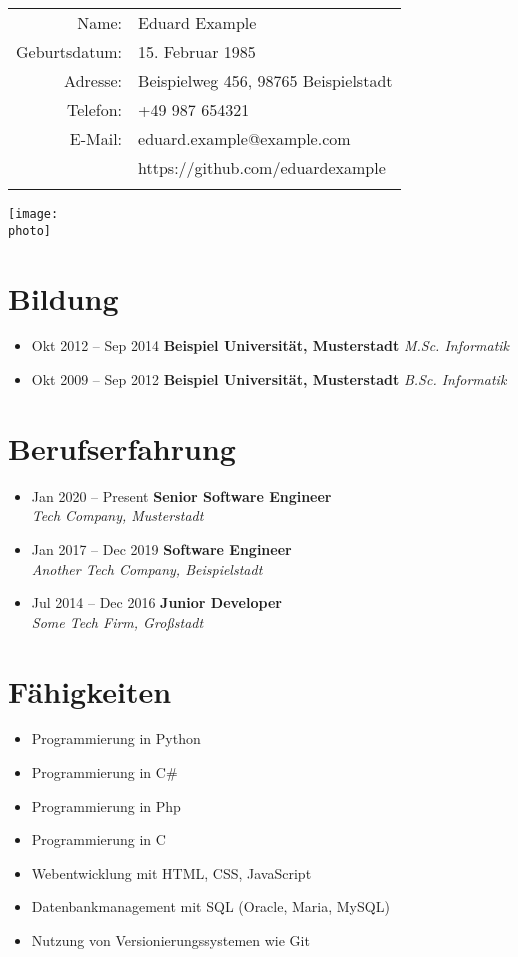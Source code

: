 \documentclass{scrartcl}
\makeatletter
\newcommand{\name}{Max Mustermann}
\newcommand{\birthdate}{1. Januar 1990}
\newcommand{\address}{Musterstraße 123, 12345 Musterstadt}
\newcommand{\phone}{+49 123 456789}
\newcommand{\email}{max.mustermann@example.com}
\newcommand{\photo}{photo.jpg} %
\newcommand{\personaldata}{
    \begin{minipage}{0.75\textwidth}
        \begin{tabular}{rl}
        Name: & \name \\
        Geburtsdatum: & \birthdate \\
        Adresse: & \address \\
        Telefon: & \phone \\
        E-Mail: & \email \\
        \ifthenelse{\isundefined{\github}}{}{GitHub: & \github \\}
        \end{tabular}
    \end{minipage}
    \begin{minipage}{0.24\textwidth}
        \raggedleft
        \texttt{[image: \\photo]} %
    \end{minipage}
    \vspace{.2cm} %
}
\newcommand{\educationitem}[3]{%
    \item #1 \textbf{#2} \textit{#3}
}
\newcommand{\education}[1]{
    \section*{Bildung}
    \begin{itemize}[left=0pt, label={--}]
        #1
    \end{itemize}
}
\newcommand{\careeritem}[3]{%
    \item #1 \hfill \textbf{#2} \\
    \textit{#3}
}
\newcommand{\career}[1]{
    \section*{Berufserfahrung}
    \begin{itemize}[left=0pt, label={--}]
        #1
    \end{itemize}
}
\newcommand{\skills}[1]{
    \section*{Fähigkeiten}
    \begin{itemize}[left=0pt, label={--}]
        #1
    \end{itemize}
}
\makeatother
\begin{document}
\renewcommand{\name}{Eduard Example}
\renewcommand{\birthdate}{15. Februar 1985}
\renewcommand{\address}{Beispielweg 456, 98765 Beispielstadt}
\renewcommand{\phone}{+49 987 654321}
\renewcommand{\email}{eduard.example@example.com}
\renewcommand{\photo}{photo.jpg}
\newcommand{\github}{https://github.com/eduardexample}  %

\personaldata

\education{
    \educationitem{Okt 2012 -- Sep 2014}{Beispiel Universität, Musterstadt}{M.Sc. Informatik}
    \educationitem{Okt 2009 -- Sep 2012}{Beispiel Universität, Musterstadt}{B.Sc. Informatik}
}

\career{
    \careeritem{Jan 2020 -- Present}{Senior Software Engineer}{Tech Company, Musterstadt}
    \careeritem{Jan 2017 -- Dec 2019}{Software Engineer}{Another Tech Company, Beispielstadt}
    \careeritem{Jul 2014 -- Dec 2016}{Junior Developer}{Some Tech Firm, Großstadt}
}

\skills{
    \item Programmierung in Python
    \item Programmierung in C\#
    \item Programmierung in Php
    \item Programmierung in C
    \item Webentwicklung mit HTML, CSS, JavaScript
    \item Datenbankmanagement mit SQL (Oracle, Maria, MySQL)
    \item Nutzung von Versionierungssystemen wie Git
}
\end{document}
